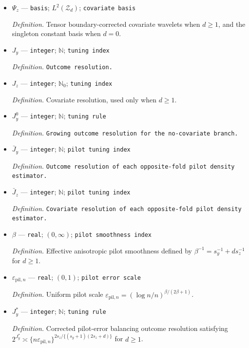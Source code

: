 \documentclass{article}
\begin{document}
\begin{itemize}
  \item \(\Psi_z\) --- \texttt{basis}; \(L^2(\mathcal Z_d)\); \texttt{covariate basis}
  \par\smallskip\noindent\emph{Definition.} Tensor boundary-corrected covariate wavelets when \(d\ge1\), and the singleton constant basis when \(d=0\).
  \item \(J_y\) --- \texttt{integer}; \(\mathbb N\); \texttt{tuning index}
  \par\smallskip\noindent\emph{Definition.} \texttt{Outcome resolution.}
  \item \(J_z\) --- \texttt{integer}; \(\mathbb N_0\); \texttt{tuning index}
  \par\smallskip\noindent\emph{Definition.} Covariate resolution, used only when \(d\ge1\).
  \item \(J_y^0\) --- \texttt{integer}; \(\mathbb N\); \texttt{tuning rule}
  \par\smallskip\noindent\emph{Definition.} \texttt{Growing outcome resolution for the no-\allowbreak{}covariate branch.}
  \item \(\bar J_y\) --- \texttt{integer}; \(\mathbb N\); \texttt{pilot tuning index}
  \par\smallskip\noindent\emph{Definition.} \texttt{Outcome resolution of each opposite-\allowbreak{}fold pilot density estimator.}
  \item \(\bar J_z\) --- \texttt{integer}; \(\mathbb N\); \texttt{pilot tuning index}
  \par\smallskip\noindent\emph{Definition.} \texttt{Covariate resolution of each opposite-\allowbreak{}fold pilot density estimator.}
  \item \(\beta\) --- \texttt{real}; \((0,\infty)\); \texttt{pilot smoothness index}
  \par\smallskip\noindent\emph{Definition.} Effective anisotropic pilot smoothness defined by \(\beta^{-1}=s_y^{-1}+d s_z^{-1}\) for \(d\ge1\).
  \item \(\varepsilon_{\mathrm{pil},n}\) --- \texttt{real}; \((0,1)\); \texttt{pilot error scale}
  \par\smallskip\noindent\emph{Definition.} Uniform pilot scale \(\varepsilon_{\mathrm{pil},n}=(\log n/n)^{\beta/(2\beta+1)}\).
  \item \(J_y^*\) --- \texttt{integer}; \(\mathbb N\); \texttt{tuning rule}
  \par\smallskip\noindent\emph{Definition.} Corrected pilot-error balancing outcome resolution satisfying \(2^{J_y^*}\asymp\{n\varepsilon_{\mathrm{pil},n}\}^{2s_z/\{(s_y+1)(2s_z+d)\}}\) for \(d\ge1\).

\end{itemize}
\end{document}
